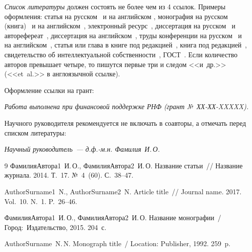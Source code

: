\documentclass{YM_Likhanova}
\newcommand{\No}{№}
\begin{document}
{{ \it Список литературы} должен состоять не более чем из 4 ссылок.
Примеры оформления: статья на русском~\cite{ct_SvoyaFamiliyaInicialy_1} и 
на английском \cite{ct_SvoyaFamiliyaInicialy_2},
монография на русском	(книга)~\cite{ct_SvoyaFamiliyaInicialy_3} и
на английском~\cite{ct_SvoyaFamiliyaInicialy_4},
электронный ресурс~\cite{ct_SvoyaFamiliyaInicialy_5},
диссертация на русском~\cite{ct_SvoyaFamiliyaInicialy_6} и авторефереат~\cite{ct_SvoyaFamiliyaInicialy_7},
диссертация на английском~\cite{ct_SvoyaFamiliyaInicialy_8},
труды конференции на русском~\cite{ct_SvoyaFamiliyaInicialy_9} и на английском~\cite{ct_SvoyaFamiliyaInicialy_10},
статья или глава в книге под редакцией~\cite{ct_SvoyaFamiliyaInicialy_11},
книга под редакцией~\cite{ct_SvoyaFamiliyaInicialy_12},
свидетельство об интеллектуальной собственности~\cite{ct_SvoyaFamiliyaInicialy_13},
ГОСТ~\cite{ct_SvoyaFamiliyaInicialy_14}. Если количество авторов превышает четыре, то пишутся первые три и следом <<и~др.>> (<<et~al.>> в англоязычной ссылке). 

Оформление ссылки на грант:

\emph{Работа выполнена при финансовой поддержке РНФ (грант \No~ХХ-ХХ-XXXXX).}

Научного руководителя рекомендуется не включать в соавторы, а отмечать перед списком литературы:

\emph{Научный руководитель~--- д.ф.-м.н. Фамилия~И.\,О.}

\begin{thebibliography}{9}
{\sc ФамилияАвтора1~И.\,О., ФамилияАвтора2~И.\,О.}
Название статьи~// Название журнала. 2014. Т.~17. №~4~(60). С.~38--47.
 
{\sc AuthorSurname1~N., AuthorSurname2~N.}
Article title~// Journal name. 2017. Vol.~10. N.~1. P.~26--46.

{\sc ФамилияАвтора1~И.\,О., ФамилияАвтора2~И.\,О.}
Название монографии~/ Город:~Издательство, 2015. 204~с.
 
{\sc AuthorSurname~N.\,N.}
Monograph title~/ Location: Publisher, 1992. 259~p.
 

\end{thebibliography}}
\end{document}
